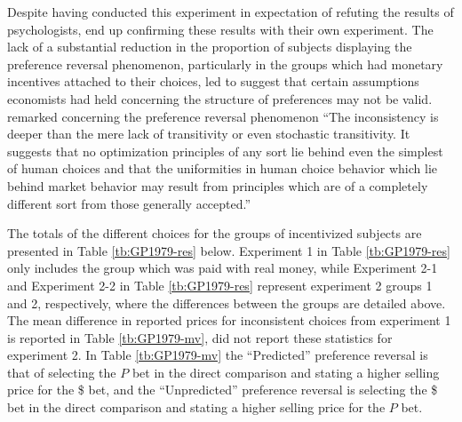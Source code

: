 \documentclass[../main.tex]{subfiles}
\begin{document}
Despite having conducted this experiment in expectation of refuting the results of psychologists, \textcite{Grether1979} end up confirming these results with their own experiment.
The lack of a substantial reduction in the proportion of subjects displaying the preference reversal phenomenon, particularly in the groups which had monetary incentives attached to their choices, led \textcite{Grether1979} to suggest that certain assumptions economists had held concerning the structure of preferences may not be valid.
\textcite[623]{Grether1979} remarked concerning the preference reversal phenomenon \enquote{The inconsistency is deeper than the mere lack of transitivity or even stochastic transitivity.
It suggests that no optimization principles of any sort lie behind even the simplest of human choices and that the uniformities in human choice behavior which lie behind market behavior may result from principles which are of a completely different sort from those generally accepted.} 

The totals of the different choices for the groups of incentivized subjects are presented in Table \ref{tb:GP1979-res} below.
Experiment 1 in Table \ref{tb:GP1979-res} only includes the group which was paid with real money, while Experiment 2-1 and Experiment 2-2 in Table \ref{tb:GP1979-res} represent experiment 2 groups 1 and 2, respectively,  where the differences between the groups are detailed above.
The mean difference in reported prices for inconsistent choices from experiment 1 is reported in Table \ref{tb:GP1979-mv}, \textcite{Grether1979} did not report these statistics for experiment 2.
In Table \ref{tb:GP1979-mv} the \enquote{Predicted} preference reversal is that of selecting the $P$ bet in the direct comparison and stating a higher selling price for the {\$} bet, and the \enquote{Unpredicted} preference reversal is selecting the {\$} bet in the direct comparison and stating a higher selling price for the $P$ bet.
\end{document}
